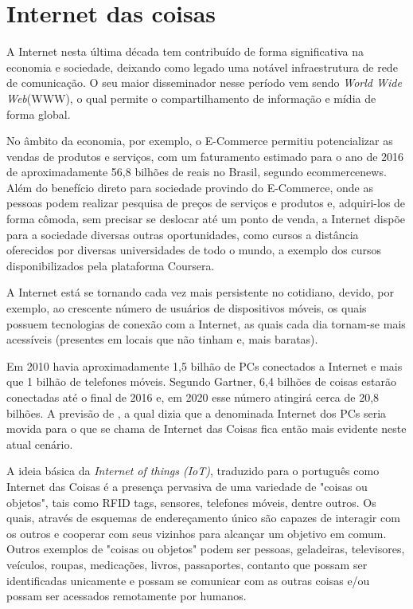 ﻿\section{Internet das coisas}
\label{sec:iot}
A Internet nesta última década tem contribuído de forma significativa na economia e sociedade, deixando como legado uma notável infraestrutura de rede de comunicação. O seu maior disseminador nesse período vem sendo \textit{World Wide Web}(WWW), o qual permite o compartilhamento de informação e mídia de forma global\cite{Chandrakanth:2014}.

No âmbito da economia, por exemplo, o E-Commerce permitiu potencializar as vendas de produtos e serviços, com um faturamento estimado para o ano de 2016 de aproximadamente 56,8 bilhões de reais no Brasil, segundo ecommercenews\footnotemark {}. Além do benefício direto para sociedade provindo do E-Commerce, onde as pessoas podem realizar pesquisa de preços de serviços e produtos e, adquiri-los de forma cômoda, sem precisar se deslocar até um ponto de venda, a Internet dispõe para a sociedade diversas outras oportunidades, como cursos a distância oferecidos por diversas universidades de todo o mundo, a exemplo dos cursos disponibilizados pela plataforma Coursera\footnotemark {}. 

A Internet está se tornando cada vez mais persistente no cotidiano, devido, por exemplo, ao crescente número de usuários de dispositivos móveis, os quais possuem tecnologias de conexão com a Internet, as quais cada dia tornam-se mais acessíveis (presentes em locais que não tinham e, mais baratas)\cite{Chandrakanth:2014}.

Em 2010 havia aproximadamente 1,5 bilhão de PCs conectados a Internet e mais que 1 bilhão de telefones móveis\cite{Sundmaeker:2010}. Segundo Gartner\footnotemark {}, 6,4 bilhões de coisas estarão conectadas até o final de 2016 e, em 2020 esse número atingirá cerca de 20,8 bilhões. A previsão de \cite{Sundmaeker:2010}, a qual dizia que a denominada Internet dos PCs seria movida para o que se chama de Internet das Coisas fica então mais evidente neste atual cenário.

A ideia básica da \textit{Internet of things (IoT)}, traduzido para o português como Internet das Coisas é a presença pervasiva de uma variedade de "coisas ou objetos", tais como RFID tags, sensores, telefones móveis, dentre outros. Os quais, através de esquemas de endereçamento único são capazes de interagir com os outros e cooperar com seus vizinhos para alcançar um objetivo em comum\cite{Atzori:2010}. Outros exemplos de "coisas ou objetos" podem ser pessoas, geladeiras, televisores, veículos, roupas, medicações, livros, passaportes, contanto que possam ser identificadas unicamente e possam se comunicar com as outras coisas e/ou possam ser acessados remotamente por humanos.

